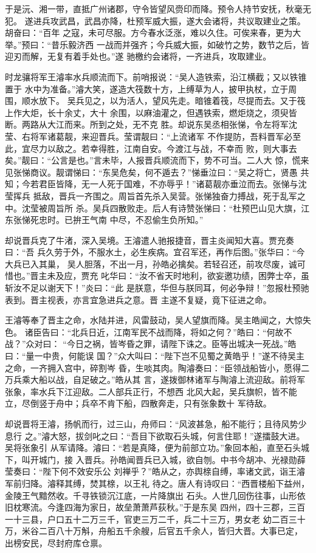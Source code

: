 于是沅、湘一带，直抵广州诸郡，守令皆望风赍印而降。预令人持节安抚，秋毫无犯。
遂进兵攻武昌，武昌亦降，杜预军威大振，遂大会诸将，共议取建业之策。胡奋曰：“百年
之寇，未可尽服。方今春水泛涨，难以久住。可俟来春，更为大举。”预曰：“昔乐毅济西
一战而并强齐；今兵威大振，如破竹之势，数节之后，皆迎刃而解，无复有着手处也。”遂
驰檄约会诸将，一齐进兵，攻取建业。

时龙骧将军王濬率水兵顺流而下。前哨报说：“吴人造铁索，沿江横截；又以铁锥置于
水中为准备。”濬大笑，遂造大筏数十方，上缚草为人，披甲执杖，立于周围，顺水放下。
吴兵见之，以为活人，望风先走。暗锥着筏，尽提而去。又于筏上作大炬，长十余丈，大十
余围，以麻油灌之，但遇铁索，燃炬烧之，须臾皆断。两路从大江而来。所到之处，无不克
胜。却说东吴丞相张悌，令左将军沈莹、右将军诸葛靓，来迎晋兵。莹谓靓曰：“上流诸军
不作提防，吾料晋军必至此，宜尽力以敌之。若幸得胜，江南自安。今渡江与战，不幸而
败，则大事去矣。”靓曰：“公言是也。”言未毕，人报晋兵顺流而下，势不可当。二人大
惊，慌来见张悌商议。靓谓悌曰：“东吴危矣，何不遁去？”悌垂泣曰：“吴之将亡，贤愚
共知；今若君臣皆降，无一人死于国难，不亦辱乎！”诸葛靓亦垂泣而去。张悌与沈莹挥兵
抵敌，晋兵一齐围之。周旨首先杀入吴营。张悌独奋力搏战，死于乱军之中。沈莹被周旨所
杀。吴兵四散败走。后人有诗赞张悌曰：“杜预巴山见大旗，江东张悌死忠时。已拚王气南
中尽，不忍偷生负所知。”

却说晋兵克了牛渚，深入吴境。王濬遣人驰报捷音，晋主炎闻知大喜。贾充奏曰：“吾
兵久劳于外，不服水土，必生疾病。宜召军还，再作后图。”张华曰：“今大兵已入其巢，
吴人胆落，不出一月，孙皓必擒矣。若轻召还，前攻尽废，诚可惜也。”晋主未及应，贾充
叱华曰：“汝不省天时地利，欲妄邀功绩，困弊士卒，虽斩汝不足以谢天下！”炎曰：“此
是朕意，华但与朕同耳，何必争辩！”忽报杜预驰表到。晋主视表，亦言宜急进兵之意。晋
主遂不复疑，竟下征进之命。

王濬等奉了晋主之命，水陆并进，风雷鼓动，吴人望旗而降。吴主皓闻之，大惊失色。
诸臣告曰：“北兵日近，江南军民不战而降，将如之何？”皓曰：“何故不战？”众对曰：
“今日之祸，皆岑昏之罪，请陛下诛之。臣等出城决一死战。”皓曰：“量一中贵，何能误
国？”众大叫曰：“陛下岂不见蜀之黄皓乎！”遂不待吴主之命，一齐拥入宫中，碎割岑
昏，生啖其肉。陶濬奏曰：“臣领战船皆小，愿得二万兵乘大船以战，自足破之。”皓从其
言，遂拨御林诸军与陶濬上流迎敌。前将军张象，率水兵下江迎敌。二人部兵正行，不想西
北风大起，吴兵旗帜，皆不能立，尽倒竖于舟中；兵卒不肯下船，四散奔走，只有张象数十
军待敌。

却说晋将王濬，扬帆而行，过三山，舟师曰：“风波甚急，船不能行；且待风势少息行
之。”濬大怒，拔剑叱之曰：“吾目下欲取石头城，何言住耶！”遂擂鼓大进。吴将张象引
从军请降。濬曰：“若是真降，便为前部立功。”象回本船，直至石头城下，叫开城门，接
入晋兵。孙皓闻晋兵已入城，欲自刎。中书今胡冲、光禄勋薛莹奏曰：“陛下何不效安乐公
刘禅乎？”皓从之，亦舆榇自缚，率诸文武，诣王濬军前归降。濬释其缚，焚其榇，以王礼
待之。唐人有诗叹曰：“西晋楼船下益州，金陵王气黯然收。千寻铁锁沉江底，一片降旗出
石头。人世几回伤往事，山形依旧枕寒流。今逢四海为家日，故垒萧萧芦荻秋。”于是东吴
四州，四十三郡，三百一十三县，户口五十二万三千，官吏三万二千，兵二十三万，男女老
幼二百三十万，米谷二百八十万斛，舟船五千余艘，后官五千余人，皆归大晋。大事已定，
出榜安民，尽封府库仓禀。

